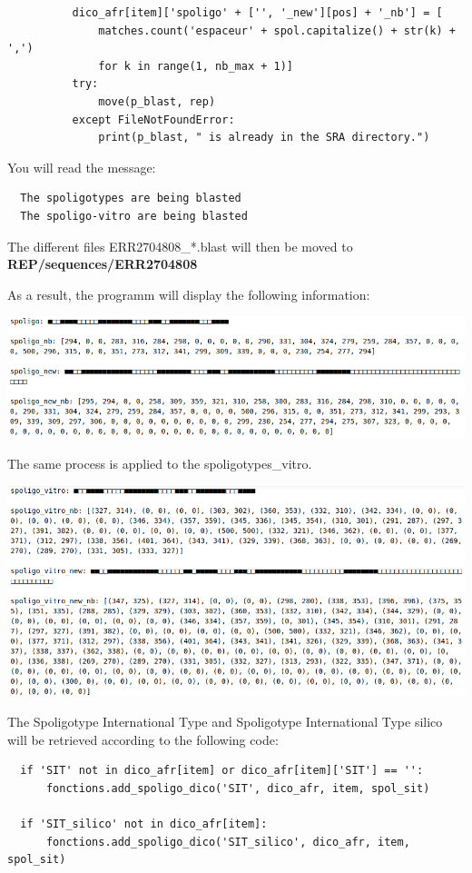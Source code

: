 \documentclass[twoside,a4paper,11pt,frenchb,openany]{report}
\begin{document}
\begin{verbatim}
          dico_afr[item]['spoligo' + ['', '_new'][pos] + '_nb'] = [
              matches.count('espaceur' + spol.capitalize() + str(k) + ',')
              for k in range(1, nb_max + 1)]
          try:
              move(p_blast, rep)
          except FileNotFoundError:
              print(p_blast, " is already in the SRA directory.")
\end{verbatim}

    You will read the message:

    \begin{verbatim}
  The spoligotypes are being blasted
  The spoligo-vitro are being blasted
\end{verbatim}

    The different files ERR2704808\_*.blast will then be moved to
\textbf{REP/sequences/ERR2704808}

    As a result, the programm will display the following information:

\includegraphics[width=16.5cm]{spoligo1.png}

    The same process is applied to the spoligotypes\_vitro.

\includegraphics[width=16.5cm]{spoligo2.png}

    The Spoligotype International Type and Spoligotype International Type
silico will be retrieved according to the following code:

\begin{verbatim}
  if 'SIT' not in dico_afr[item] or dico_afr[item]['SIT'] == '':
      fonctions.add_spoligo_dico('SIT', dico_afr, item, spol_sit)

  if 'SIT_silico' not in dico_afr[item]:
      fonctions.add_spoligo_dico('SIT_silico', dico_afr, item, spol_sit)
\end{verbatim}
\end{document}
